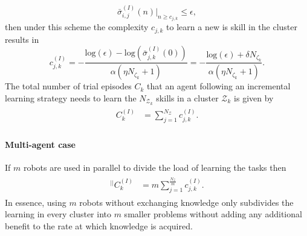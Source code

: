 \begin{equation*}
	\bar{\sigma}^{(I)}_{i,j}(n) \rvert_{n \ge c_{j,k}} \leq \epsilon,
\end{equation*}
then under this scheme the complexity $c_{j,k}$ to learn a new is skill in the cluster results in
\begin{equation}\label{eq:complexity_IL}
	c^{(I)}_{j,k} = -\frac{\text{log}(\epsilon) - \text{log}\left(\bar{\sigma}^{(I)}_{j,k}(0)\right)}{\alpha (\eta N_{\zeta_k}+ 1)} = -\frac{\text{log}(\epsilon) + \delta N_{\zeta_k}}{\alpha (\eta N_{\zeta_k}+ 1)}  .
\end{equation}
The total number of trial episodes $ C_k $ that an agent following an incremental learning strategy needs to learn the $N_{\mathcal{Z}_k}$ skills in a cluster $ \mathcal{Z}_k $ is given by
\begin{align}\label{eq:total_episodes_incremental}
	\begin{split}
		C^{(I)}_k &= \sum^{N_{\mathcal{Z}}}_{j=1} c^{(I)}_{j,k}.
	\end{split}
\end{align}

\paragraph*{Multi-agent case}
If $m$ robots are used in parallel to divide the load of learning the tasks then
\begin{align}
	\begin{split}
		{}^{\lvert \rvert}C^{(I)}_k &= m\sum^{\frac{N_{\mathcal{Z}}}{m}}_{j=1} c^{(I)}_{j,k}.
	\end{split}
\end{align}
In essence, using $m$ robots without exchanging knowledge only subdivides the learning in every cluster into $m$ smaller problems without adding any additional benefit to the rate at which knowledge is acquired. 

